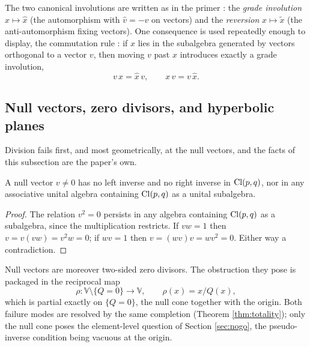The two canonical involutions are written as in the primer \cite[Section 5]{ButlerT0}: the \emph{grade involution} $x \mapsto \hat{x}$ (the automorphism with $\hat{v} = -v$ on vectors) and the \emph{reversion} $x \mapsto \tilde{x}$ (the anti-automorphism fixing vectors). One consequence is used repeatedly enough to display, the commutation rule \cite[Lemma 9.1]{ButlerT0}: if $x$ lies in the subalgebra generated by vectors orthogonal to a vector $v$, then moving $v$ past $x$ introduces exactly a grade involution,
\begin{equation}\label{eq:commutation}
v\,x = \hat{x}\,v, \qquad x\,v = v\,\hat{x}.
\end{equation}

\subsection{Null vectors, zero divisors, and hyperbolic planes}\label{subsec:null}

Division fails first, and most geometrically, at the null vectors, and the facts of this subsection are the paper's own.

\begin{lemma}\label{lem:noinverse}
A null vector $v \neq 0$ has no left inverse and no right inverse in $\mathrm{Cl}(p,q)$, nor in any associative unital algebra containing $\mathrm{Cl}(p,q)$ as a unital subalgebra.
\end{lemma}

\begin{proof}
The relation $v^2 = 0$ persists in any algebra containing $\mathrm{Cl}(p,q)$ as a subalgebra, since the multiplication restricts. If $vw = 1$ then $v = v(vw) = v^2 w = 0$; if $wv = 1$ then $v = (wv)v = wv^2 = 0$. Either way a contradiction.
\end{proof}

Null vectors are moreover two-sided zero divisors. The obstruction they pose is packaged in the reciprocal map
\[
\rho : \mathbb{V} \setminus \{Q = 0\} \to \mathbb{V}, \qquad \rho(x) = x / Q(x),
\]
which is partial exactly on $\{Q = 0\}$, the null cone together with the origin. Both failure modes are resolved by the same completion (Theorem \ref{thm:totality}); only the null cone poses the element-level question of Section \ref{sec:nogo}, the pseudo-inverse condition being vacuous at the origin.

